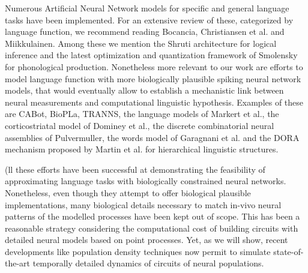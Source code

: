 \documentclass[10pt]{article}
\newcommand{\noteCP}[1]{}
\newcommand{\noteMP}[3]{(}
\begin{document}
Numerous Artificial Neural Network models for specific and general language tasks have been implemented.
For an extensive review of these, categorized by language function, we recommend reading Bocancia\cite{bocancia2014psycholinguistically}, 
Christiansen et al.\cite{Christiansen_1999} and Miikkulainen\cite{miikkulainen1997natural}.
Among these we mention the Shruti architecture for logical inference\cite{Wendelken_2004} and the latest optimization and quantization framework of Smolensky for phonological 
production\cite{Smolensky_2013}.
Nonetheless more relevant to our work are efforts to model language function with more biologically plausible spiking neural network models, 
that would eventually allow to establish a mechanistic link between neural measurements and computational linguistic hypothesis.
Examples of these are CABot\cite{Huyck_2009}, BioPLa\cite{rosa2004thematic}, TRANNS\cite{bocancia2014psycholinguistically}, the language models of Markert et al.\cite{Markert_2007}, the corticostriatal model of Dominey et al.\cite{Dominey_2009}, the discrete combinatorial neural assemblies of Pulvermuller\cite{Pulverm_ller_2009, Pulverm_ller_2010}, the words model of Garagnani et al.\cite{Garagnani_2017} and the DORA mechanism proposed by Martin et al. for hierarchical linguistic structures\cite{Martin_2017}.
\noteCP{Feels a lot of name dropping: it would be nice to details a tiny bit 2 or 3 ideas from these papers.}
\noteMP{They are supposed to be here just for detailed reference of spiking neural network models, but they do not really compete with the NBA in the way the tensor framework does and as in the case of the previously mentioned ANNs they are related to specific or general language tasks that very indirectly implement variable binding. I changed the wording of their presentation and think detailing them would just deviate from the point}.

All these efforts have been successful at demonstrating the feasibility of approximating language tasks with biologically constrained neural networks.
Nonetheless, even though they attempt to offer biological plausible implementations, many biological details necessary to match in-vivo neural patterns of the modelled processes have been kept out of scope.
This has been a reasonable strategy considering the computational cost of building circuits with detailed neural models based on point processes.
Yet, as we will show, recent developments like population density
techniques\cite{de2013generica} now permit to simulate state-of-the-art temporally detailed dynamics of circuits of neural populations.
\end{document}
